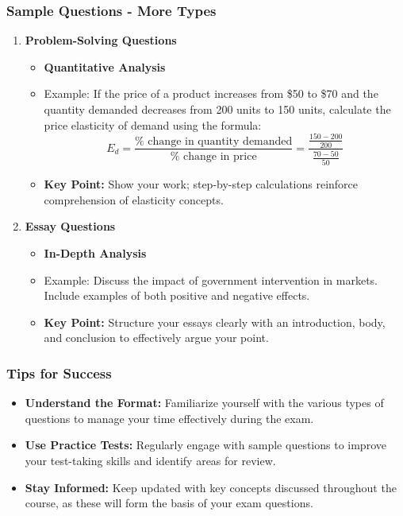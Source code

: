 \documentclass{beamer}
\begin{document}
\begin{frame}[fragile]
    \frametitle{Sample Questions - More Types}
    \begin{enumerate}[resume]
        \item \textbf{Problem-Solving Questions}
        \begin{itemize}
            \item \textbf{Quantitative Analysis}
            \item Example: If the price of a product increases from \$50 to \$70 and the quantity demanded decreases from 200 units to 150 units, calculate the price elasticity of demand using the formula:
            \begin{equation}
            E_d = \frac{\% \text{ change in quantity demanded}}{\% \text{ change in price}} = \frac{\frac{150 - 200}{200}}{\frac{70 - 50}{50}}
            \end{equation}
            \item \textbf{Key Point:} Show your work; step-by-step calculations reinforce comprehension of elasticity concepts.
        \end{itemize}
        
        \item \textbf{Essay Questions}
        \begin{itemize}
            \item \textbf{In-Depth Analysis}
            \item Example: Discuss the impact of government intervention in markets. Include examples of both positive and negative effects.
            \item \textbf{Key Point:} Structure your essays clearly with an introduction, body, and conclusion to effectively argue your point.
        \end{itemize}
    \end{enumerate}
\end{frame}

\begin{frame}[fragile]
    \frametitle{Tips for Success}
    \begin{itemize}
        \item \textbf{Understand the Format:} Familiarize yourself with the various types of questions to manage your time effectively during the exam.
        \item \textbf{Use Practice Tests:} Regularly engage with sample questions to improve your test-taking skills and identify areas for review.
        \item \textbf{Stay Informed:} Keep updated with key concepts discussed throughout the course, as these will form the basis of your exam questions.
    \end{itemize}
\end{frame}
\end{document}
